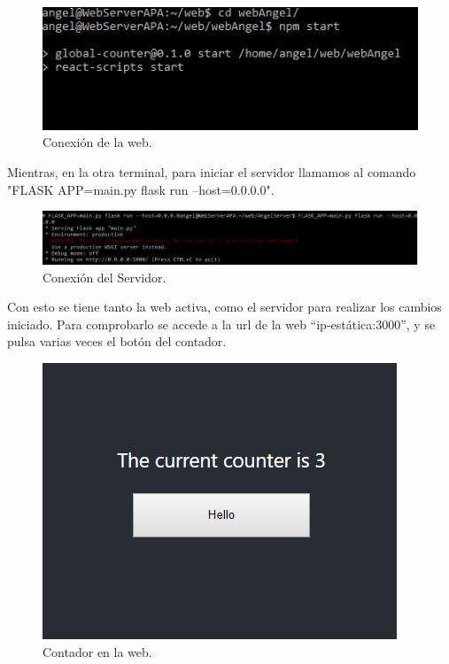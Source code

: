 \documentclass[english,runningheads,a4paper]{llncs}[2018/03/10]
\begin{document}
\begin{figure}[h!]
 \includegraphics[width=\linewidth]{./Web/Azure/ConexionWeb.png}
 \caption{Conexión de la web.}
\end{figure}

Mientras, en la otra terminal, para iniciar el servidor llamamos al comando "FLASK APP=main.py flask run –host=0.0.0.0".

\begin{figure}[h!]
 \includegraphics[width=\linewidth]{./Web/Azure/ConexionServer.png}
 \caption{Conexión del Servidor.}
\end{figure}

Con esto se tiene tanto la web activa, como el servidor para realizar los cambios
iniciado. Para comprobarlo se accede a la url de la web “ip-estática:3000”, y se
pulsa varias veces el botón del contador.

\begin{figure}[h!]
 \includegraphics[width=\linewidth]{./Web/Azure/Contador.png}
 \caption{Contador en la web.}
\end{figure}
\end{document}

